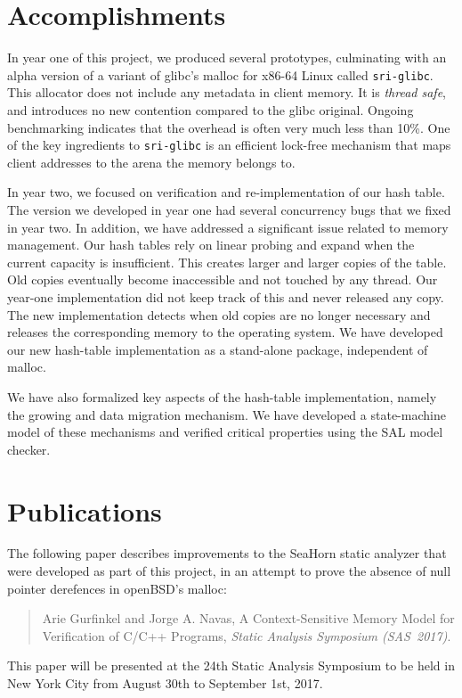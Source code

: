 \documentclass[12pt]{cslreport}
\begin{document}
\section{Accomplishments}

In  year  one  of  this   project,  we  produced  several  prototypes,
culminating with an  alpha version of a variant of  glibc's malloc for
x86-64  Linux  called  \texttt{sri-glibc}.  This  allocator  does  not
include any metadata in client memory.  It is {\em thread safe\/}, and
introduces no new  contention compared to the  glibc original. Ongoing
benchmarking indicates that the overhead  is often very much less than
10\%.   One  of  the  key  ingredients  to  \texttt{sri-glibc}  is  an
efficient lock-free mechanism that maps  client addresses to the arena
the memory belongs to.

In year two, we focused on verification and re-implementation of our
hash table. The version we developed in year one had several
concurrency bugs that we fixed in year two. In addition, we have
addressed a significant issue related to memory management. Our hash
tables rely on linear probing and expand when the current capacity is
insufficient. This creates larger and larger copies of the table. Old
copies eventually become inaccessible and not touched by any
thread. Our year-one implementation did not keep track of this and
never released any copy. The new implementation detects when old
copies are no longer necessary and releases the corresponding memory
to the operating system. We have developed our new hash-table
implementation as a stand-alone package, independent of malloc.

We have also formalized key aspects of the hash-table implementation,
namely the growing and data migration mechanism. We have developed a
state-machine model of these mechanisms and verified critical
properties using the SAL model checker.


\section{Publications}

The following paper describes improvements to the SeaHorn static
analyzer that were developed as part of this project, in an attempt to
prove the absence of null pointer derefences in openBSD's malloc:
\begin{quote}
  Arie Gurfinkel and Jorge A. Navas, A Context-Sensitive Memory Model
  for Verification of C/C++ Programs, {\em Static Analysis Symposium
    (SAS~2017)\/}.
\end{quote}
This paper will be presented at the 24th Static Analysis Symposium
to be held in New York City from August 30th to September 1st, 2017.
\end{document}
